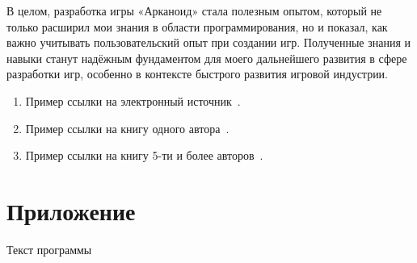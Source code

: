 \documentclass[14pt, oneside]{altsu-report}
\begin{document}
В целом, разработка игры «Арканоид» стала полезным опытом, который не только расширил мои знания в области программирования, но и показал, как важно учитывать пользовательский опыт при создании игр. Полученные знания и навыки станут надёжным фундаментом для моего дальнейшего развития в сфере разработки игр, особенно в контексте быстрого развития игровой индустрии.

\begin{enumerate}
\item Пример ссылки на электронный источник~\cite{wikiRUArkanoid,wikiRUQtDocumentation,wikiRUHabr}.
\item Пример ссылки на книгу одного автора~\cite{book1author}.
\item Пример ссылки на книгу 5-ти и более авторов~\cite{book5author}.
\end{enumerate}

\newpage
{}
\printbibliography[title={Список использованной литературы}]

\appendix
\newpage
\chapter*{\raggedleft\label{appendix1}Приложение}

\begin{center}
\label{code:appendix}Текст программы
\end{center}

\begin{code}
\vspace{-1cm}\inputminted{C}{src/arcanoid.py}
\end{code}
\end{document}
